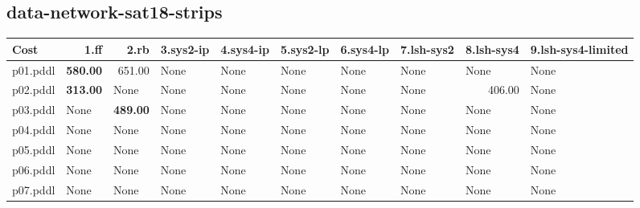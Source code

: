 \documentclass{article}
\begin{document}
\hypertarget{cost-data-network-sat18-strips}{}
\subsection*{data-network-sat18-strips}

\begin{tabular}{@{}lrrrrrrrrr@{}}
Cost & 1.ff & 2.rb & 3.sys2-ip & 4.sys4-ip & 5.sys2-lp & 6.sys4-lp & 7.lsh-sys2 & 8.lsh-sys4 & 9.lsh-sys4-limited \\
\midrule
p01.pddl & \textbf{580.00} & 651.00 & \multicolumn{1}{|l|}{None} & \multicolumn{1}{|l|}{None} & \multicolumn{1}{|l|}{None} & \multicolumn{1}{|l|}{None} & \multicolumn{1}{|l|}{None} & \multicolumn{1}{|l|}{None} & \multicolumn{1}{|l|}{None} \\
p02.pddl & \textbf{313.00} & \multicolumn{1}{|l|}{None} & \multicolumn{1}{|l|}{None} & \multicolumn{1}{|l|}{None} & \multicolumn{1}{|l|}{None} & \multicolumn{1}{|l|}{None} & \multicolumn{1}{|l|}{None} & 406.00 & \multicolumn{1}{|l|}{None} \\
p03.pddl & \multicolumn{1}{|l|}{None} & \textbf{489.00} & \multicolumn{1}{|l|}{None} & \multicolumn{1}{|l|}{None} & \multicolumn{1}{|l|}{None} & \multicolumn{1}{|l|}{None} & \multicolumn{1}{|l|}{None} & \multicolumn{1}{|l|}{None} & \multicolumn{1}{|l|}{None} \\
p04.pddl & \multicolumn{1}{|l|}{None} & \multicolumn{1}{|l|}{None} & \multicolumn{1}{|l|}{None} & \multicolumn{1}{|l|}{None} & \multicolumn{1}{|l|}{None} & \multicolumn{1}{|l|}{None} & \multicolumn{1}{|l|}{None} & \multicolumn{1}{|l|}{None} & \multicolumn{1}{|l|}{None} \\
p05.pddl & \multicolumn{1}{|l|}{None} & \multicolumn{1}{|l|}{None} & \multicolumn{1}{|l|}{None} & \multicolumn{1}{|l|}{None} & \multicolumn{1}{|l|}{None} & \multicolumn{1}{|l|}{None} & \multicolumn{1}{|l|}{None} & \multicolumn{1}{|l|}{None} & \multicolumn{1}{|l|}{None} \\
p06.pddl & \multicolumn{1}{|l|}{None} & \multicolumn{1}{|l|}{None} & \multicolumn{1}{|l|}{None} & \multicolumn{1}{|l|}{None} & \multicolumn{1}{|l|}{None} & \multicolumn{1}{|l|}{None} & \multicolumn{1}{|l|}{None} & \multicolumn{1}{|l|}{None} & \multicolumn{1}{|l|}{None} \\
p07.pddl & \multicolumn{1}{|l|}{None} & \multicolumn{1}{|l|}{None} & \multicolumn{1}{|l|}{None} & \multicolumn{1}{|l|}{None} & \multicolumn{1}{|l|}{None} & \multicolumn{1}{|l|}{None} & \multicolumn{1}{|l|}{None} & \multicolumn{1}{|l|}{None} & \multicolumn{1}{|l|}{None} \\

\end{tabular}
\end{document}
